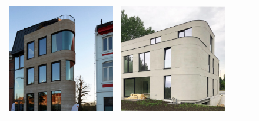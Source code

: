 \begin{figure}[H]
{\begin{tabular}{@{}ccccc@{}}
      \includegraphics[width=\linewidth]{Images/LoRAs/Ghoek/Training_images/6.jpeg} &
      \includegraphics[width=\linewidth]{Images/LoRAs/Ghoek/Training_images/7.jpeg} &

\end{tabular}}
\end{figure}
